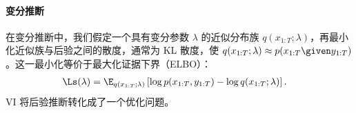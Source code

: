 \paragraph{变分推断}\label{sec:vi}
在变分推断中，我们假定一个具有变分参数 $\lambda$ 的近似分布族 $q(x_{1:T};\lambda)$，再最小化近似族与后验之间的散度，通常为 KL 散度，使 $q(x_{1:T};\lambda)\approx p(x_{1:T}\given y_{1:T})$。这一最小化等价于最大化证据下界（ELBO）\citep{Jordan1999}：
\begin{align}
\Ls(\lambda)&=\E_{q(x_{1:T};\lambda)}\left[\log p(x_{1:T},y_{1:T})-\log q(x_{1:T};\lambda)\right].\label{eq:elbo}
\end{align}
VI 将后验推断转化成了一个优化问题。
